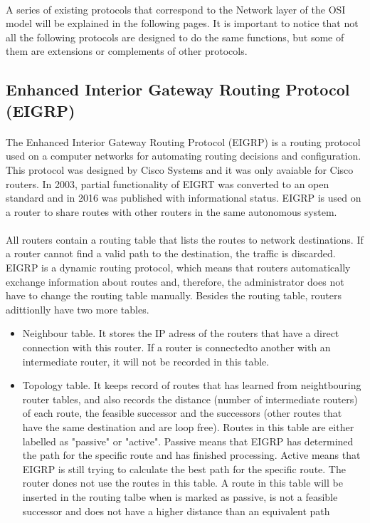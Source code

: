 \documentclass[12pt,a4paper]{report}
\begin{document}
\paragraph{}A series of existing protocols that correspond to the Network layer of the OSI model will be explained in the following pages. It is important to notice that not all the following protocols are designed to do the same functions, but some of them are extensions or complements of other protocols.

\subsection{Enhanced Interior Gateway Routing Protocol (EIGRP)}
\paragraph{}The Enhanced Interior Gateway Routing Protocol (EIGRP) is a routing protocol used on a computer networks for automating routing decisions and configuration. This protocol was designed by Cisco Systems and it was only avaiable for Cisco routers. In 2003, partial functionality of EIGRT was converted to an open standard and in 2016 was published with informational status. EIGRP is used on a router to share routes with other routers in the same autonomous system.
\paragraph{}All routers contain a routing table that lists the routes to network destinations. If a router cannot find a valid path to the destination, the traffic is discarded. EIGRP is a dynamic routing protocol, which means that routers automatically exchange information about routes and, therefore, the administrator does not have to change the routing table manually. Besides the routing table, routers adittionlly have two more tables.
\begin{itemize}
	\item Neighbour table. It stores the IP adress of the routers that have a direct connection with this router. If a router is connectedto another with an intermediate router, it will not be recorded in this table.
	\item Topology table. It keeps record of routes that has learned from neightbouring router tables, and also records the distance (number of intermediate routers) of each route, the feasible successor and the successors (other routes that have the same destination and are loop free). Routes in this table are either labelled as "passive" or "active". Passive means that EIGRP  has determined the path for the specific route and has finished processing. Active means that EIGRP is still trying to calculate the best path for the specific route. The router dones not use the routes in this table. A route in this table will be inserted in the routing talbe when is marked as passive, is not a feasible successor and does not have a higher distance than an equivalent path
\end{itemize}
\end{document}
